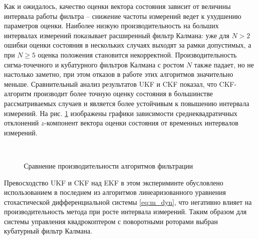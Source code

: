 Как и ожидалось, качество оценки вектора состояния зависит от величины интервала работы фильтра --
снижение частоты измерений ведет к ухудшению параметров оценки.
Наиболее низкую производительность на больших интервалах измерений показывает расширенный фильтр Калмана:
уже для $N>2$ ошибки оценки состояния в нескольких случаях выходят за рамки допустимых,
а при $N \geq 5$ оценка положения становится некорректной.
Производительность сигма-точечного и кубатурного фильтров Калмана с ростом $N$ также падает,
но не настолько заметно, при этом отказов в работе этих алгоритмов значительно меньше.
Сравнительный анализ результатов UKF и CKF показал, что CKF-алгоритм производит более точную оценку состояния
в большинстве рассматриваемых случаев и является более устойчивым к повышению интервала измерений.
На рис. \ref{fig:est_cmpr} изображены графики зависимости среднеквадратичных отклонений
$z$-компонент вектора оценки состояния от временных интервалов измерений.
\begin{figure}[h]
	\begin{minipage}[h]{0.49\linewidth}
	\end{minipage}
	\hfill
	\begin{minipage}[h]{0.49\linewidth}
	\end{minipage}
	\\
	\begin{minipage}[h]{0.49\linewidth}
	\end{minipage}
	\hfill
	\begin{minipage}[h]{0.49\linewidth}
	\end{minipage}
	\caption{Сравнение производительности алгоритмов фильтрации}
    \label{fig:est_cmpr}
\end{figure}

Превосходство UKF и CKF над EKF в этом экспериминте
обусловлено использованием в последнем из алгоритмов
линеаризованного уравнения стохастической дифференциальной системы \eqref{eq:m_dyn},
что негативно влияет на производительность метода при росте интервала измерений. Таким образом для системы управления квадрокоптером с поворотными роторами выбран кубатурный фильтр Калмана.

